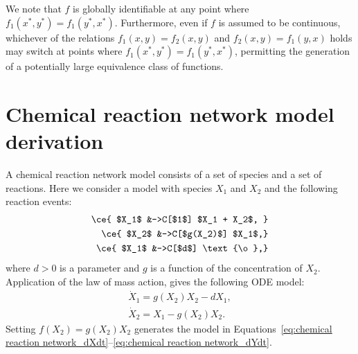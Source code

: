 \documentclass{article}
\theoremstyle{plain}
\theoremstyle{definition}
\begin{document}
{\begin{enumerate}
    We note that $f$ is globally identifiable at any point where $f_1(x^*,y^*)=f_1(y^*,x^*)$. Furthermore, even if $f$ is assumed to be continuous, whichever of the relations $f_1(x,y)=f_2(x,y)$ and $f_2(x,y)=f_1(y,x)$ holds may switch at points where $f_1(x^*,y^*)=f_1(y^*,x^*)$, permitting the generation of a potentially large equivalence class of functions.
\end{enumerate}


\section{Chemical reaction network model derivation} \label{appendix:chemical reaction network_derivation}

A chemical reaction network model consists of a set of species and a set of reactions. Here we consider a model with species $X_1$ and $X_2$ and the following reaction events:
\begin{align*}
\ce{ $X_1$ &->C[$1$] $X_1 + X_2$, } \\
\ce{ $X_2$ &->C[$g(X_2)$] $X_1$,} \\
\ce{ $X_1$ &->C[$d$] \text{\o},}
\end{align*}
where $d>0$ is a parameter and $g$ is a function of the concentration of $X_2$. Application of the law of mass action, gives the following ODE model:
\begin{align*}
    \dot{X}_1 = g(X_2)X_2 - dX_1, \\
    \dot{X}_2 = X_1 - g(X_2)X_2.
\end{align*}
Setting $f(X_2) = g(X_2)X_2$ generates the model in Equations~\eqref{eq:chemical reaction network_dXdt}--\eqref{eq:chemical reaction network_dYdt}.


}
\end{document}
